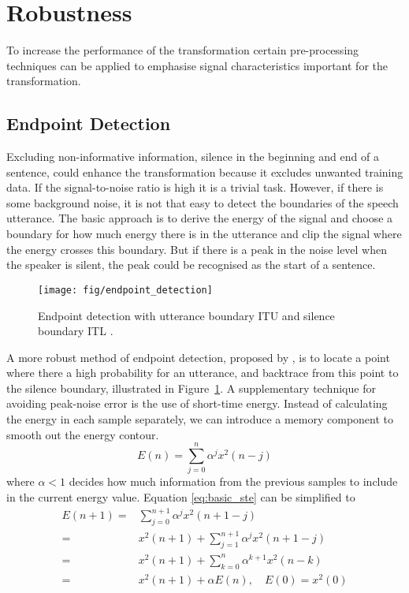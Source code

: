 

\section{Robustness} %
\label{sec:robustness}
To increase the performance of the transformation certain pre-processing techniques can be applied to emphasise signal characteristics important for the transformation.

\subsection{Endpoint Detection} %
\label{sub:endpoint_detection}
Excluding non-informative information, \eg silence in the beginning and end of a sentence, could enhance the transformation because it excludes unwanted training data. If the signal-to-noise ratio is high it is a trivial task. However, if there is some background noise, it is not that easy to detect the boundaries of the speech utterance. The basic approach is to derive the energy of the signal and choose a boundary for how much energy there is in the utterance and clip the signal where the energy crosses this boundary. But if there is a peak in the noise level when the speaker is silent, the peak could be recognised as the start of a sentence.

\begin{figure}[htbp]
	\begin{center}
		\texttt{[image: fig/endpoint\_detection]}
		\caption{Endpoint detection with utterance boundary ITU and silence boundary ITL \cite{rabiner75}.}
		\label{fig:endpoint_detection}
	\end{center}
\end{figure}
A more robust method of endpoint detection, proposed by \cite{rabiner75}, is to locate a point where there a high probability for an utterance, and backtrace from this point to the silence boundary, illustrated in Figure~\ref{fig:endpoint_detection}. A supplementary technique for avoiding peak-noise error is the use of short-time energy. Instead of calculating the energy in each sample separately, we can introduce a memory component to smooth out the energy contour.
\begin{equation}
	E(n)=\sum_{j=0}^{n}\alpha^j x^2(n-j)
	\label{eq:basic_ste}
\end{equation}
where $\alpha < 1$ decides how much information from the previous samples to include in the current energy value. Equation \eqref{eq:basic_ste} can be simplified to
\begin{equation}
	\begin{split}
		E(n+1)=& \sum_{j=0}^{n+1}\alpha^jx^2(n+1-j)\\
		=& x^2(n+1)+\sum_{j=1}^{n+1}\alpha^jx^2(n+1-j)\\
		=& x^2(n+1)+\sum_{k=0}^{n}\alpha^{k+1} x^2(n-k)\\
		=& x^2(n+1)+\alpha E(n), \quad E(0)=x^2(0)\\
	\end{split}
	\label{eq:short_time_energy}
\end{equation}

